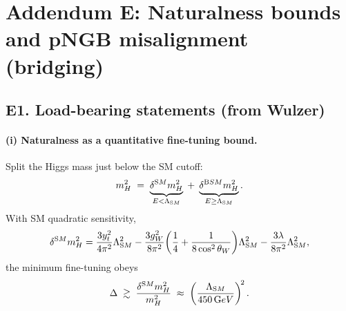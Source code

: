 \documentclass[11pt]{article}
\begin{document}
  \titlepageOpen

  \begin{abstract}


  \end{abstract}

  \titlepageClose
  \fi

  \ifdefined\standalonechapter
  \section{\papertitle}
  \else
  \fi



  \section*{Addendum E: Naturalness bounds and pNGB misalignment (bridging)}

      \subsection*{E1. Load-bearing statements (from Wulzer)}
          \paragraph{(i) Naturalness as a quantitative fine-tuning bound.}
              Split the Higgs mass just below the SM cutoff:
              \begin{equation}\label{eq:E_split}
          m_H^2 \;=\; \underbrace{\delta^{\textrm SM} m_H^2}_{E<\Lambda_{\textrm SM}}
          \;+\; \underbrace{\delta^{\textrm BSM} m_H^2}_{E\ge \Lambda_{\textrm SM}} .
              \end{equation}
              With SM quadratic sensitivity,
              \begin{equation}\label{eq:E_quad}
          \delta^{\textrm SM} m_H^2
          =\frac{3y_t^2}{4\pi^2}\Lambda_{\textrm SM}^2
          -\frac{3g_W^2}{8\pi^2}\!\left(\frac14+\frac{1}{8\cos^2\theta_W}\right)\!\Lambda_{\textrm SM}^2
          -\frac{3\lambda}{8\pi^2}\Lambda_{\textrm SM}^2,
              \end{equation}
              the minimum fine-tuning obeys
              \begin{equation}\label{eq:E_tuning}
          \Delta \;\gtrsim\; \frac{\delta^{\textrm SM} m_H^2}{m_H^2}
          \;\approx\; \left(\frac{\Lambda_{\textrm SM}}{450\,{\textrm GeV}}\right)^{\!2}.
              \end{equation}
\end{document}
